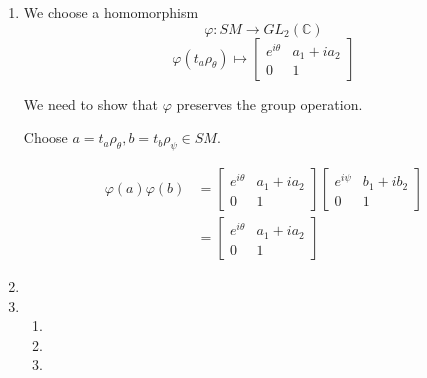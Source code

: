 \documentclass[12pt,letterpaper]{article}
\newcommand{\ghg}[1]{g#1g^{-1}}
\begin{document}
\begin{enumerate}
\begin{proof}
        \begin{align*}
          \ghg{h} &= t_g \rho_\theta (t_h \rho_\psi r) t_{-g} \rho_{-\theta} \\
          &= t_g (\rho_\theta t_h) \rho_\psi r t_{-g} \rho_{-\theta} \\
          &= t_g (t_h' \rho_\theta) \rho_\psi r t_{-g} \rho_{-\theta} \\
          &= (t_g t_h') (\rho_\theta \rho_\psi) r t_{-g} \rho_{-\theta} \\
          &= t_{g + h'} \rho_{\theta + \psi} r t_{-g} \rho_{-\theta} \\
          &= t_{g + h'} \rho_{\theta + \psi} (t_{-g'} r) \rho_{-\theta} \\
          &= t_{g + h'} \rho_{\theta + \psi} t_{-g'} (\rho_\theta r) \\
          &= t_{g + h'} \rho_{\theta + \psi} t_{-g'} (\rho_\theta r) \\
        \end{align*}
      \end{proof}
    \item
      We choose a homomorphism
      \[
        \varphi : SM \rightarrow GL_2(\mathbb{C})
      \]
      \[
        \varphi(t_a\rho_\theta) \mapsto
        \begin{bmatrix}
          e^{i \theta} & a_1 + i a_2 \\
          0 & 1
        \end{bmatrix}
      \]

      We need to show that $\varphi$ preserves the group operation.

      Choose $a = t_a \rho_\theta, b = t_b \rho_\psi \in SM$.

      \begin{align*}
        \varphi(a)\varphi(b) &=
        \begin{bmatrix}
          e^{i \theta} & a_1 + i a_2 \\
          0 & 1
        \end{bmatrix}
        \begin{bmatrix}
          e^{i \psi} & b_1 + i b_2 \\
          0 & 1
        \end{bmatrix} \\
        &=
        \begin{bmatrix}
          e^{i \theta} & a_1 + i a_2 \\
          0 & 1
        \end{bmatrix}
      \end{align*}
    \item
    \item
      \begin{enumerate}
        \item
        \item
        \item
      \end{enumerate}
  \end{enumerate}
\end{document}
